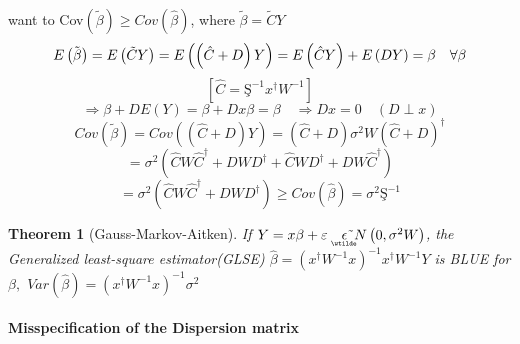 \documentclass{article}
\newtheorem{theorem}{Theorem}
\begin{document}
want to Cov$\left( \tilde{\beta}\right) \geq Cov\left( \hat{\beta}\right) $,
where $\tilde{\beta}=\tilde{C}Y$%
\begin{equation*}
E\left( \tilde{\beta}\right) =E\left( \tilde{C}Y\right) =E\left( \left( \hat{%
C}+D\right) Y\right) =E\left( \hat{C}Y\right) +E\left( DY\right) =\beta
\quad \forall \beta 
\end{equation*}%
\begin{equation*}
\left[ \hat{C}=\text{\c{S}}^{-1}x^{\dagger }W^{-1}\right] 
\end{equation*}%
\begin{equation*}
\Rightarrow \beta +DE\left( Y\right) =\beta +Dx\beta =\beta \quad
\Rightarrow Dx=0\quad \left( D\perp x\right) 
\end{equation*}%
\begin{equation*}
Cov\left( \tilde{\beta}\right) =Cov\left( \left( \hat{C}+D\right) Y\right)
=\left( \hat{C}+D\right) \sigma ^{2}W\left( \hat{C}+D\right) ^{\dagger }
\end{equation*}%
\begin{equation*}
=\sigma ^{2}\left( \hat{C}W\hat{C}^{\dagger }+DWD^{\dagger }+\hat{C}%
WD^{\dagger }+DW\hat{C}^{\dagger }\right) 
\end{equation*}%
\begin{equation*}
=\sigma ^{2}\left( \hat{C}W\hat{C}^{\dagger }+DWD^{\dagger }\right) \geq
Cov\left( \hat{\beta}\right) =\sigma ^{2}\text{\c{S}}^{-1}
\end{equation*}

\bigskip

\begin{theorem}[Gauss-Markov-Aitken]
If $Y=x\beta +\varepsilon \quad 
\underaccent{\wtilde}{\epsilon}%
\symbol{126}N\left( 0,\sigma ^{2}W\right) $, the Generalized least-square
estimator(GLSE) $\hat{\beta}=\left( x^{\dagger }W^{-1}x\right)
^{-1}x^{\dagger }W^{-1}Y$ is BLUE for $\beta ,$ $Var\left( \hat{\beta}%
\right) =\left( x^{\dagger }W^{-1}x\right) ^{-1}\sigma ^{2}$
\end{theorem}

\bigskip

\paragraph{Misspecification of the Dispersion matrix}

\quad

\bigskip 
\end{document}
